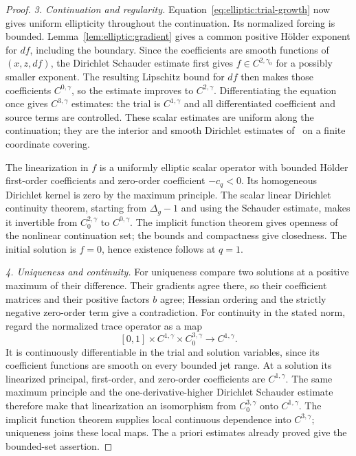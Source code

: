 \begin{proof}
\medskip\noindent\emph{3. Continuation and regularity.}
Equation~\eqref{eq:elliptic:trial-growth} now gives uniform ellipticity
throughout the continuation.  Its normalized forcing is bounded.
Lemma~\ref{lem:elliptic:gradient} gives a common positive H\"older
exponent for $df$, including the boundary.  Since the coefficients
are smooth functions of $(x,z,df)$, the Dirichlet Schauder estimate
first gives $f\in C^{2,\gamma_0}$ for a possibly smaller exponent.
The resulting Lipschitz bound for $df$ then makes those coefficients
$C^{0,\gamma}$, so the estimate improves to $C^{2,\gamma}$.
Differentiating the equation once gives $C^{3,\gamma}$ estimates:
the trial is $C^{1,\gamma}$ and all differentiated coefficient and
source terms are controlled.  These scalar estimates are uniform
along the continuation; they are the interior and smooth Dirichlet
estimates of~\cite{GilbargTrudinger} on a finite coordinate covering.

The linearization in $f$ is a uniformly elliptic scalar operator with
bounded H\"older first-order coefficients and zero-order coefficient
$-c_q<0$.  Its homogeneous Dirichlet kernel is zero by the maximum
principle.  The scalar linear Dirichlet continuity theorem, starting
from $\Delta_g-1$ and using the Schauder estimate, makes it invertible
from $C^{2,\gamma}_0$ to $C^{0,\gamma}$.
The implicit function theorem gives openness of the nonlinear
continuation set; the bounds and compactness give closedness.
The initial solution is $f=0$, hence existence follows at $q=1$.

\medskip\noindent\emph{4. Uniqueness and continuity.}
For uniqueness compare two solutions at a positive maximum of their
difference.  Their gradients agree there, so their coefficient
matrices and their positive factors $b$ agree; Hessian ordering and
the strictly negative zero-order term give a contradiction.
For continuity in the stated norm, regard the normalized trace
operator as a map
\[
 [0,1]\times C^{1,\gamma}\times C^{3,\gamma}_0
                    \longrightarrow C^{1,\gamma}.
\]
It is continuously differentiable in the trial and solution variables,
since its coefficient functions are smooth on every bounded jet range.
At a solution its linearized principal, first-order, and zero-order
coefficients are $C^{1,\gamma}$.  The same maximum principle and
the one-derivative-higher Dirichlet Schauder estimate therefore make
that linearization an isomorphism from $C^{3,\gamma}_0$ onto
$C^{1,\gamma}$.  The implicit function theorem supplies local
continuous dependence into $C^{3,\gamma}$; uniqueness joins these
local maps.  The a priori estimates already proved give the
bounded-set assertion.
\end{proof}

